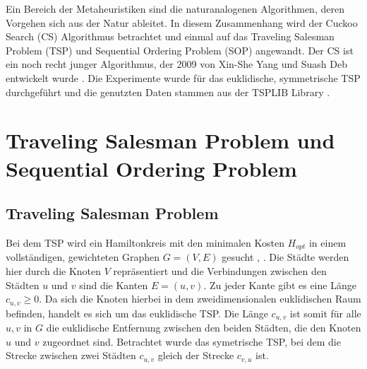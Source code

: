 \documentclass[conference]{IEEEtran}
\begin{document}
Ein Bereich der Metaheuristiken sind die naturanalogenen Algorithmen, deren Vorgehen sich aus der Natur ableitet. In diesem Zusammenhang wird der Cuckoo Search (CS) Algorithmus betrachtet und einmal auf das Traveling Salesman Problem (TSP) und Sequential Ordering Problem (SOP) angewandt. Der CS ist ein noch recht junger Algorithmus, der 2009 von Xin-She Yang und Suash Deb entwickelt wurde \cite{b1}. Die Experimente wurde für das euklidische, symmetrische TSP durchgeführt und die genutzten Daten stammen aus der TSPLIB Library \cite{b12}.

  \section{Traveling Salesman Problem und Sequential Ordering Problem}
    \subsection{Traveling Salesman Problem}
      Bei dem TSP wird ein Hamiltonkreis mit den minimalen Kosten $H_{opt}$ in einem vollständigen, 
      gewichteten Graphen $G = (V,E)$ gesucht \cite{b2}, \cite{b3}. Die Städte werden hier durch 
      die Knoten $V$ repräsentiert und die Verbindungen zwischen den Städten $u$ und $v$ sind die 
      Kanten $E = (u,v)$. Zu jeder Kante gibt es eine Länge $c_{u,v} \geq 0$. Da sich die Knoten hierbei 
      in dem zweidimensionalen euklidischen Raum befinden, handelt es sich um das euklidische TSP. 
      Die Länge $c_{u,v}$ ist somit für alle $u,v$ in $G$ die euklidische Entfernung zwischen den beiden Städten, 
      die den Knoten $u$ und $v$ zugeordnet sind. Betrachtet wurde das symetrische TSP, bei dem die Strecke 
      zwischen zwei Städten $c_{u,v}$ gleich der Strecke $c_{v,u}$ ist.
\end{document}
